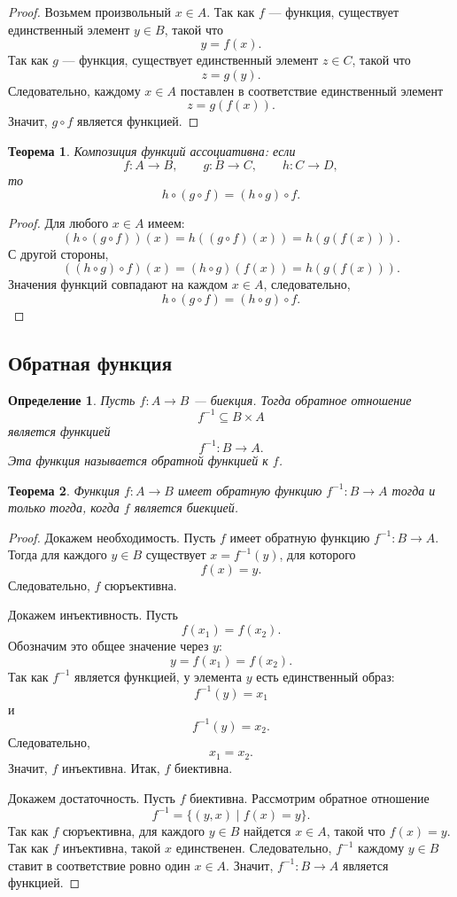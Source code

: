 \documentclass[12pt,a4paper]{article}
\newtheorem{definition}{Определение}
\newtheorem{theorem}{Теорема}
\begin{document}
\begin{proof}
Возьмем произвольный $x\in A$.
Так как $f$ --- функция, существует единственный элемент $y\in B$, такой что
\[
y=f(x).
\]
Так как $g$ --- функция, существует единственный элемент $z\in C$, такой что
\[
z=g(y).
\]
Следовательно, каждому $x\in A$ поставлен в соответствие единственный элемент
\[
z=g(f(x)).
\]
Значит, $g\circ f$ является функцией.
\end{proof}

\begin{theorem}
Композиция функций ассоциативна: если
\[
f:A\to B,\qquad g:B\to C,\qquad h:C\to D,
\]
то
\[
h\circ(g\circ f)=(h\circ g)\circ f.
\]
\end{theorem}

\begin{proof}
Для любого $x\in A$ имеем:
\[
(h\circ(g\circ f))(x)=h((g\circ f)(x))=h(g(f(x))).
\]
С другой стороны,
\[
((h\circ g)\circ f)(x)=(h\circ g)(f(x))=h(g(f(x))).
\]
Значения функций совпадают на каждом $x\in A$, следовательно,
\[
h\circ(g\circ f)=(h\circ g)\circ f.
\]
\end{proof}

\subsection{Обратная функция}

\begin{definition}
Пусть $f:A\to B$ --- биекция. Тогда обратное отношение
\[
f^{-1}\subseteq B\times A
\]
является функцией
\[
f^{-1}:B\to A.
\]
Эта функция называется \emph{обратной функцией} к $f$.
\end{definition}

\begin{theorem}
Функция $f:A\to B$ имеет обратную функцию $f^{-1}:B\to A$ тогда и только тогда, когда $f$ является биекцией.
\end{theorem}

\begin{proof}
Докажем необходимость. Пусть $f$ имеет обратную функцию $f^{-1}:B\to A$.
Тогда для каждого $y\in B$ существует $x=f^{-1}(y)$, для которого
\[
f(x)=y.
\]
Следовательно, $f$ сюръективна.

Докажем инъективность. Пусть
\[
f(x_1)=f(x_2).
\]
Обозначим это общее значение через $y$:
\[
y=f(x_1)=f(x_2).
\]
Так как $f^{-1}$ является функцией, у элемента $y$ есть единственный образ:
\[
f^{-1}(y)=x_1
\]
и
\[
f^{-1}(y)=x_2.
\]
Следовательно,
\[
x_1=x_2.
\]
Значит, $f$ инъективна. Итак, $f$ биективна.

Докажем достаточность. Пусть $f$ биективна.
Рассмотрим обратное отношение
\[
f^{-1}=\{(y,x)\mid f(x)=y\}.
\]
Так как $f$ сюръективна, для каждого $y\in B$ найдется $x\in A$, такой что $f(x)=y$.
Так как $f$ инъективна, такой $x$ единственен.
Следовательно, $f^{-1}$ каждому $y\in B$ ставит в соответствие ровно один $x\in A$.
Значит, $f^{-1}:B\to A$ является функцией.
\end{proof}
\end{document}
